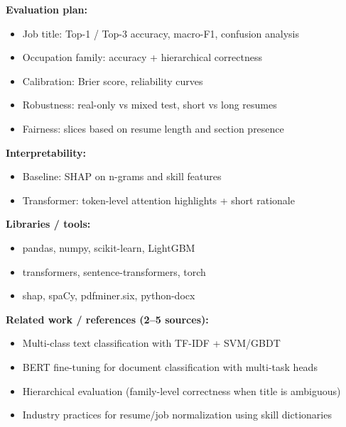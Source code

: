 \documentclass[12pt]{article}
\begin{document}
\textbf{Evaluation plan:}
\begin{itemize}
  \item Job title: Top-1 / Top-3 accuracy, macro-F1, confusion analysis
  \item Occupation family: accuracy + hierarchical correctness
  \item Calibration: Brier score, reliability curves
  \item Robustness: real-only vs mixed test, short vs long resumes
  \item Fairness: slices based on resume length and section presence
\end{itemize}

\textbf{Interpretability:}
\begin{itemize}
  \item Baseline: SHAP on n-grams and skill features
  \item Transformer: token-level attention highlights + short rationale
\end{itemize}

\textbf{Libraries / tools:}
\begin{itemize}
  \item pandas, numpy, scikit-learn, LightGBM
  \item transformers, sentence-transformers, torch
  \item shap, spaCy, pdfminer.six, python-docx
\end{itemize}

\textbf{Related work / references (2--5 sources):}
\begin{itemize}
  \item Multi-class text classification with TF-IDF + SVM/GBDT
  \item BERT fine-tuning for document classification with multi-task heads
  \item Hierarchical evaluation (family-level correctness when title is ambiguous)
  \item Industry practices for resume/job normalization using skill dictionaries
\end{itemize}
\end{document}
